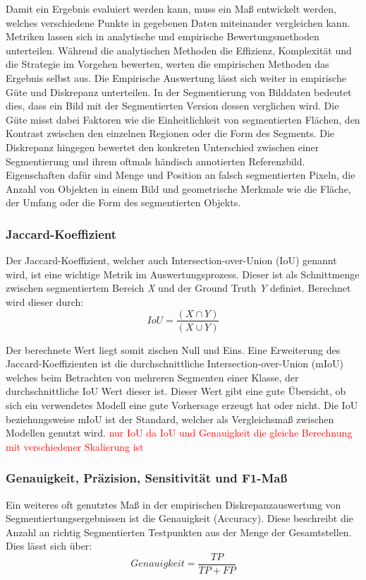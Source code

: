 Damit ein Ergebnis evaluiert werden kann, muss ein Maß entwickelt werden, welches verschiedene Punkte in gegebenen Daten miteinander vergleichen kann. Metriken lassen sich in analytische und empirische Bewertungsmethoden unterteilen. \cite{metricsPOLAK2009} 
Während die analytischen Methoden die Effizienz, Komplexität und die Strategie im Vorgehen bewerten, werten die empirischen Methoden das Ergebnis selbst aus. 
Die Empirische Auswertung lässt sich weiter in empirische Güte und Diskrepanz unterteilen. In der Segmentierung von Bilddaten bedeutet dies, dass ein Bild mit der Segmentierten Version dessen verglichen wird. Die Güte misst dabei Faktoren wie die Einheitlichkeit von segmentierten Flächen, den Kontrast zwischen den einzelnen Regionen oder die Form des Segments. Die Diskrepanz hingegen bewertet den konkreten Unterschied zwischen einer Segmentierung und ihrem oftmals händisch annotierten Referenzbild. Eigenschaften dafür sind Menge und Position an falsch segmentierten Pixeln, die Anzahl von Objekten in einem Bild und geometrische Merkmale wie die Fläche, der Umfang oder die Form des segmentierten Objekts. 

\subsubsection*{Jaccard-Koeffizient}
Der Jaccard-Koeffizient, welcher auch Intersection-over-Union (IoU) genannt wird, ist eine wichtige Metrik im Auswertungsprozess. Dieser ist als Schnittmenge zwischen segmentiertem Bereich \textit{X} und der Ground Truth \textit{Y} definiet. Berechnet wird dieser durch:
\begin{equation}
IoU = \frac{(X\cap Y)}{(X \cup  Y)}    
\end{equation}

Der berechnete Wert liegt somit zischen Null und Eins. Eine Erweiterung des Jaccard-Koeffizienten ist die durchschnittliche Intersection-over-Union (mIoU) welches beim Betrachten von mehreren Segmenten einer Klasse, der durchschnittliche IoU Wert dieser ist. 
Dieser Wert gibt eine gute Übersicht, ob sich ein verwendetes Modell eine gute Vorhersage erzeugt hat oder nicht. Die IoU beziehungsweise mIoU ist der Standard, welcher als Vergleichsmaß zwischen Modellen genutzt wird. 
\textcolor{red}{nur IoU da IoU und Genauigkeit die gleiche Berechnung mit verschiedener Skalierung ist}

\subsubsection*{Genauigkeit, Präzision, Sensitivität und F1-Maß}
Ein weiteres oft genutztes Maß in der empirischen Diskrepanzauswertung von Segmentiertungsergebnissen ist die Genauigkeit (Accuracy). Diese beschreibt die Anzahl an richtig Segmentierten Testpunkten aus der Menge der Gesamtstellen. Dies lässt sich über:
\begin{equation}
Genauigkeit = \frac{TP}{TP+FP}    
\end{equation}

